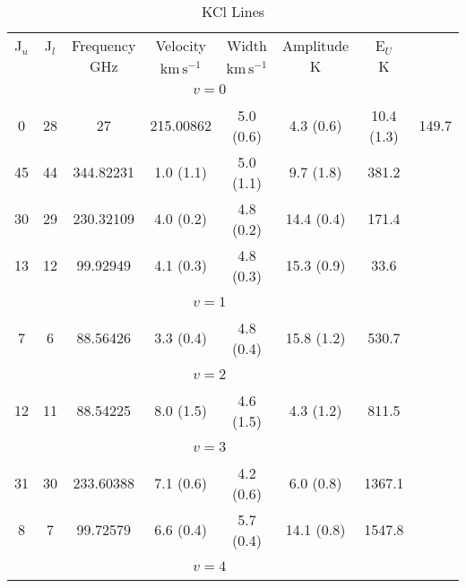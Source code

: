 \begin{table*}[htp]
\centering
\caption{KCl Lines}
\begin{tabular}{ccccccc}
\label{tab:KCl_salt_lines}
 J$_u$ & J$_l$ & Frequency & Velocity & Width & Amplitude & E$_U$ \\
  &  & $\mathrm{GHz}$ & $\mathrm{km\,s^{-1}}$ & $\mathrm{km\,s^{-1}}$ & $\mathrm{K}$ & $\mathrm{K}$ \\
\hline
&\vspace{-0.75em}\\
 \\
\vspace{-0.75em}\\
0 & 28 & 27 & 215.00862 & 5.0 (0.6) & 4.3 (0.6) & 10.4 (1.3) & 149.7 \\
 45 & 44 & 344.82231 & 1.0 (1.1) & 5.0 (1.1) & 9.7 (1.8) & 381.2 \\
 30 & 29 & 230.32109 & 4.0 (0.2) & 4.8 (0.2) & 14.4 (0.4) & 171.4 \\
 13 & 12 & 99.92949 & 4.1 (0.3) & 4.8 (0.3) & 15.3 (0.9) & 33.6 \\
&\vspace{-0.75em}\\
 \\
\vspace{-0.75em}\\
 7 & 6 & 88.56426 & 3.3 (0.4) & 4.8 (0.4) & 15.8 (1.2) & 530.7 \\
&\vspace{-0.75em}\\
 \\
\vspace{-0.75em}\\
 12 & 11 & 88.54225 & 8.0 (1.5) & 4.6 (1.5) & 4.3 (1.2) & 811.5 \\
&\vspace{-0.75em}\\
 \\
\vspace{-0.75em}\\
 31 & 30 & 233.60388 & 7.1 (0.6) & 4.2 (0.6) & 6.0 (0.8) & 1367.1 \\
 8 & 7 & 99.72579 & 6.6 (0.4) & 5.7 (0.4) & 14.1 (0.8) & 1547.8 \\
&\vspace{-0.75em}\\
 \\
\vspace{-0.75em}\\

\end{tabular}
\end{table*}
